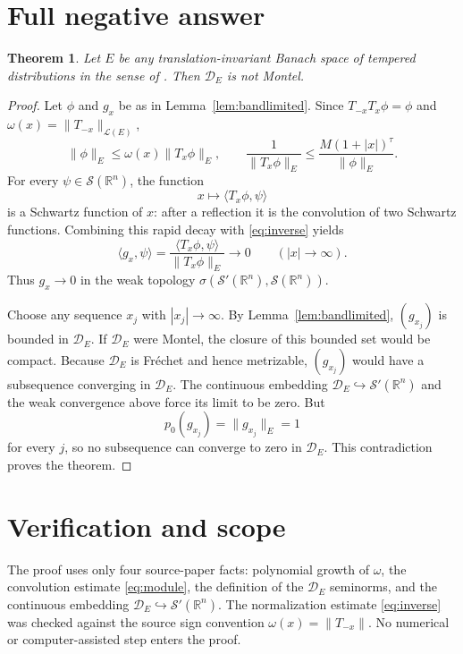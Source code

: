 \documentclass[11pt]{article}
\newtheorem{theorem}{Theorem}
\newcommand{\Dspace}{\mathcal D_E}
\newcommand{\Schwartz}{\mathcal S(\mathbb R^n)}
\newcommand{\Tempered}{\mathcal S'(\mathbb R^n)}
\begin{document}
\section{Full negative answer}

\begin{theorem}\label{thm:main}
Let $E$ be any translation-invariant Banach space of tempered distributions
in the sense of \cite{DPV}.  Then $\Dspace$ is not Montel.
\end{theorem}

\begin{proof}
Let $\phi$ and $g_x$ be as in Lemma~\ref{lem:bandlimited}.  Since
$T_{-x}T_x\phi=\phi$ and $\omega(x)=\|T_{-x}\|_{\mathcal L(E)}$,
\begin{equation}\label{eq:inverse}
  \|\phi\|_E\leq\omega(x)\|T_x\phi\|_E,
  \qquad
  \frac1{\|T_x\phi\|_E}
       \leq\frac{M(1+|x|)^\tau}{\|\phi\|_E}.
\end{equation}
For every $\psi\in\Schwartz$, the function
\[
  x\longmapsto\langle T_x\phi,\psi\rangle
\]
is a Schwartz function of $x$: after a reflection it is the convolution of
two Schwartz functions.  Combining this rapid decay with
\eqref{eq:inverse} yields
\[
  \langle g_x,\psi\rangle
  =\frac{\langle T_x\phi,\psi\rangle}{\|T_x\phi\|_E}
  \longrightarrow0
  \qquad(|x|\to\infty).
\]
Thus $g_x\to0$ in the weak topology $\sigma(\Tempered,\Schwartz)$.

Choose any sequence $x_j$ with $|x_j|\to\infty$.  By
Lemma~\ref{lem:bandlimited}, $(g_{x_j})$ is bounded in $\Dspace$.  If
$\Dspace$ were Montel, the closure of this bounded set would be compact.
Because $\Dspace$ is Fr\'echet and hence metrizable, $(g_{x_j})$ would have a
subsequence converging in $\Dspace$.  The continuous embedding
$\Dspace\hookrightarrow\Tempered$ and the weak convergence above force its
limit to be zero.  But
\[
  p_0(g_{x_j})=\|g_{x_j}\|_E=1
\]
for every $j$, so no subsequence can converge to zero in $\Dspace$.  This
contradiction proves the theorem.
\end{proof}

\section{Verification and scope}

The proof uses only four source-paper facts: polynomial growth of
$\omega$, the convolution estimate \eqref{eq:module}, the definition of the
$\Dspace$ seminorms, and the continuous embedding
$\Dspace\hookrightarrow\Tempered$.  The normalization estimate
\eqref{eq:inverse} was checked against the source sign convention
$\omega(x)=\|T_{-x}\|$.  No numerical or computer-assisted step enters the
proof.
\end{document}
